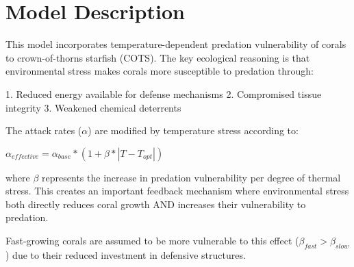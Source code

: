 \section{Model Description}

This model incorporates temperature-dependent predation vulnerability of corals to crown-of-thorns starfish (COTS). The key ecological reasoning is that environmental stress makes corals more susceptible to predation through:

1. Reduced energy available for defense mechanisms
2. Compromised tissue integrity
3. Weakened chemical deterrents

The attack rates ($\alpha$) are modified by temperature stress according to:

$\alpha_{effective} = \alpha_{base} * (1 + \beta * |T - T_{opt}|)$

where $\beta$ represents the increase in predation vulnerability per degree of thermal stress. This creates an important feedback mechanism where environmental stress both directly reduces coral growth AND increases their vulnerability to predation.

Fast-growing corals are assumed to be more vulnerable to this effect ($\beta_{fast} > \beta_{slow}$) due to their reduced investment in defensive structures.
